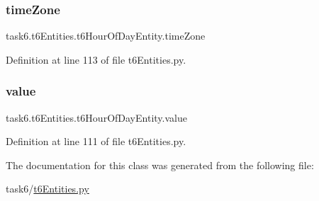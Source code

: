 \subsubsection{\texorpdfstring{time\+Zone}{timeZone}}
{\footnotesize\ttfamily task6.\+t6\+Entities.\+t6\+Hour\+Of\+Day\+Entity.\+time\+Zone}



Definition at line 113 of file t6\+Entities.\+py.

\mbox{\label{classtask6_1_1t6Entities_1_1t6HourOfDayEntity_af6e1bc0cd2063078c4908597b2832ae7}} 
\subsubsection{\texorpdfstring{value}{value}}
{\footnotesize\ttfamily task6.\+t6\+Entities.\+t6\+Hour\+Of\+Day\+Entity.\+value}



Definition at line 111 of file t6\+Entities.\+py.



The documentation for this class was generated from the following file\+:\begin{DoxyCompactItemize}
\item 
task6/\hyperlink{t6Entities_8py}{t6\+Entities.\+py}\end{DoxyCompactItemize}
